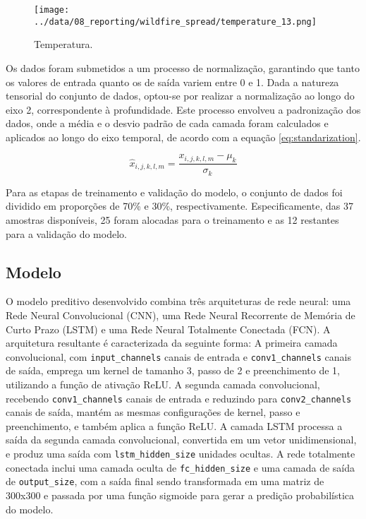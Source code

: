 \documentclass[journal]{IEEEtran}
\begin{document}
\begin{figure}[h]
        \centering
        \texttt{[image: ../data/08\_reporting/wildfire\_spread/temperature\_13.png]}
        \caption{Temperatura.}
        \label{fig:temperature}
\end{figure}

Os dados foram submetidos a um processo de normalização, garantindo que tanto os valores de entrada quanto os de saída variem entre 0 e 1. Dada a natureza tensorial do conjunto de dados, optou-se por realizar a normalização ao longo do eixo 2, correspondente à profundidade. Este processo envolveu a padronização dos dados, onde a média e o desvio padrão de cada camada foram calculados e aplicados ao longo do eixo temporal, de acordo com a equação \ref{eq:standarization}. 

\begin{equation}
    \hat{x}_{i,j,k,l,m} = \frac{x_{i,j,k,l,m} - \mu_{k}}{\sigma_{k}} \label{eq:standarization}
\end{equation}

Para as etapas de treinamento e validação do modelo, o conjunto de dados foi dividido em proporções de 70\% e 30\%, respectivamente. Especificamente, das 37 amostras disponíveis, 25 foram alocadas para o treinamento e as 12 restantes para a validação do modelo.\newline

\subsection{Modelo}

O modelo preditivo desenvolvido combina três arquiteturas de rede neural: uma Rede Neural Convolucional (CNN), uma Rede Neural Recorrente de Memória de Curto Prazo (LSTM) e uma Rede Neural Totalmente Conectada (FCN). A arquitetura resultante é caracterizada da seguinte forma: A primeira camada convolucional, com \texttt{input\_channels} canais de entrada e \texttt{conv1\_channels} canais de saída, emprega um kernel de tamanho 3, passo de 2 e preenchimento de 1, utilizando a função de ativação ReLU. A segunda camada convolucional, recebendo \texttt{conv1\_channels} canais de entrada e reduzindo para \texttt{conv2\_channels} canais de saída, mantém as mesmas configurações de kernel, passo e preenchimento, e também aplica a função ReLU. A camada LSTM processa a saída da segunda camada convolucional, convertida em um vetor unidimensional, e produz uma saída com \texttt{lstm\_hidden\_size} unidades ocultas. A rede totalmente conectada inclui uma camada oculta de \texttt{fc\_hidden\_size} e uma camada de saída de \texttt{output\_size}, com a saída final sendo transformada em uma matriz de 300x300 e passada por uma função sigmoide para gerar a predição probabilística do modelo.\newline
\end{document}
